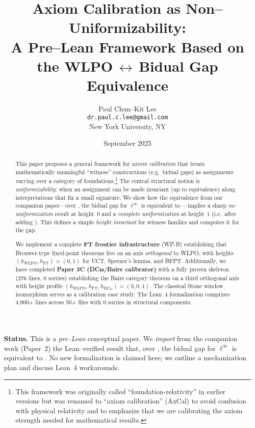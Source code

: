 \documentclass[11pt]{article}
\title{Axiom Calibration as Non--Uniformizability:\\
A Pre--Lean Framework Based on the WLPO\,$\boldsymbol{\leftrightarrow}$\,Bidual Gap Equivalence}
\author{Paul Chun--Kit Lee\\
\texttt{dr.paul.c.lee@gmail.com}\\
New York University, NY}
\date{September 2025}
\theoremstyle{definition}
\theoremstyle{remark}
\newcommand{\linf}{\ell^\infty}
\newcommand{\WLPO}{\mathrm{WLPO}}
\newcommand{\BISH}{\mathrm{BISH}}
\begin{document}
\maketitle

\begin{abstract}
This paper proposes a general framework for \emph{axiom calibration} that treats mathematically meaningful ``witness'' constructions (e.g.\ bidual gaps) as assignments varying over a category of foundations.\footnote{This framework was originally called ``foundation-relativity'' in earlier versions but was renamed to ``axiom calibration'' (AxCal) to avoid confusion with physical relativity and to emphasize that we are calibrating the axiom strength needed for mathematical results.} The central structural notion is \emph{uniformizability}: when an assignment can be made invariant (up to equivalence) along interpretations that fix a small signature. We show how the equivalence from our companion paper---over \BISH, the bidual gap for $\linf$ is equivalent to \WLPO---implies a sharp \emph{no--uniformization} result at height~$0$ and a \emph{complete uniformization} at height~$1$ (i.e.\ after adding \WLPO). This defines a simple \emph{height invariant} for witness families and computes it for the gap.

We implement a complete \textbf{FT frontier infrastructure} (WP-B) establishing that Brouwer-type fixed-point theorems live on an axis \emph{orthogonal} to WLPO, with heights $(h_{\text{WLPO}}, h_{\text{FT}}) = (0, 1)$ for UCT, Sperner's lemma, and BFPT. Additionally, we have completed \textbf{Paper 3C (DCω/Baire calibrator)} with a fully proven skeleton (276 lines, 0 sorries) establishing the Baire category theorem on a third orthogonal axis with height profile $(h_{\text{WLPO}}, h_{\text{FT}}, h_{\text{DCω}}) = (0, 0, 1)$. The classical Stone window isomorphism serves as a calibration case study. The Lean~4 formalization comprises 4,900+ lines across 50+ files with 0 sorries in structural components.
\end{abstract}

\begin{mdframed}[style=status]
\textbf{Status.} This is a \emph{pre--Lean} conceptual paper. We \emph{import} from the companion work (Paper~2) the Lean--verified result that, over \BISH, the bidual gap for $\linf$ is equivalent to \WLPO. No new formalization is claimed here; we outline a mechanization plan and discuss Lean~4 workarounds.
\end{mdframed}
\end{document}
